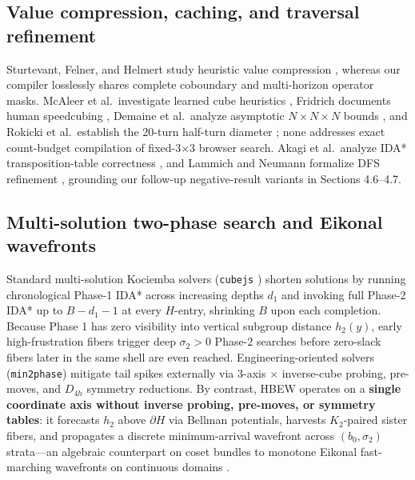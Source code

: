 \documentclass[10pt,twocolumn,letterpaper]{article}
\begin{document}
\hypertarget{value-compression-caching-and-traversal-refinement}{%
\subsection{Value compression, caching, and traversal refinement}\label{value-compression-caching-and-traversal-refinement}}

Sturtevant, Felner, and Helmert study heuristic value compression
\cite{sturtevant2017}, whereas our compiler losslessly shares complete
coboundary and multi-horizon operator masks. McAleer et al.~investigate
learned cube heuristics \cite{mcaleer2018}, Fridrich documents human
speedcubing \cite{fridrich}, Demaine et al.~analyze asymptotic
\(N\times N\times N\) bounds \cite{demaine2011}, and Rokicki et
al.~establish the 20-turn half-turn diameter \cite{rokicki_gods_number};
none addresses exact count-budget compilation of fixed-3×3 browser
search. Akagi et al.~analyze IDA* transposition-table correctness
\cite{akagi2010}, and Lammich and Neumann formalize DFS refinement
\cite{lammich2015}, grounding our follow-up negative-result variants in
Sections 4.6--4.7.

\hypertarget{multi-solution-two-phase-search-and-eikonal-wavefronts}{%
\subsection{Multi-solution two-phase search and Eikonal wavefronts}\label{multi-solution-two-phase-search-and-eikonal-wavefronts}}

Standard multi-solution Kociemba solvers (\texttt{cubejs} \cite{cubejs})
shorten solutions by running chronological Phase-1 IDA* across
increasing depths \(d_1\) and invoking full Phase-2 IDA* up to
\(B - d_1 - 1\) at every \(H\)-entry, shrinking \(B\) upon each
completion. Because Phase 1 has zero visibility into vertical subgroup
distance \(h_2(y)\), early high-frustration fibers trigger deep
\(\sigma_2 > 0\) Phase-2 searches before zero-slack fibers later in the
same shell are even reached. Engineering-oriented solvers
(\texttt{min2phase}) mitigate tail spikes externally via 3-axis
\(\times\) inverse-cube probing, pre-moves, and \(D_{4h}\) symmetry
reductions. By contrast, HBEW operates on a \textbf{single coordinate
axis without inverse probing, pre-moves, or symmetry tables}: it
forecasts \(h_2\) above \(\partial H\) via Bellman potentials, harvests
\(K_2\)-paired sister fibers, and propagates a discrete minimum-arrival
wavefront across \((b_0, \sigma_2)\) strata---an algebraic counterpart
on coset bundles to monotone Eikonal fast-marching wavefronts on
continuous domains \cite{sethian1996}.
\end{document}

